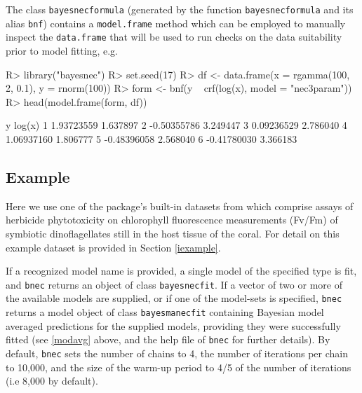 \documentclass[
  shortnames]{jss}
\begin{document}
The class \texttt{bayesnecformula} (generated by the function \texttt{bayesnecformula} and its alias \texttt{bnf}) contains a \texttt{model.frame} method which can be employed to manually inspect the \texttt{data.frame} that will be used to run checks on the data suitability prior to model fitting, e.g.

\begin{CodeChunk}
\begin{CodeInput}
R> library("bayesnec")
R> set.seed(17)
R> df <- data.frame(x = rgamma(100, 2, 0.1), y = rnorm(100))
R> form <- bnf(y ~ crf(log(x), model = "nec3param"))
R> head(model.frame(form, df))
\end{CodeInput}
\begin{CodeOutput}
            y   log(x)
1  1.93723559 1.637897
2 -0.50355786 3.249447
3  0.09236529 2.786040
4  1.06937160 1.806777
5 -0.48396058 2.568040
6 -0.41780030 3.366183
\end{CodeOutput}
\end{CodeChunk}

\newpage

\hypertarget{example}{%
\subsection{Example}\label{example}}

Here we use one of the package's built-in datasets from \citet{jones2003meps} which comprise assays of herbicide phytotoxicity on chlorophyll fluorescence measurements (Fv/Fm) of symbiotic dinoflagellates still in the host tissue of the coral. For detail on this example dataset is provided in Section \ref{iexample}.

\begin{CodeChunk}
\end{CodeChunk}

If a recognized model name is provided, a single model of the specified type is fit, and \texttt{bnec} returns an object of class \texttt{bayesnecfit}. If a vector of two or more of the available models are supplied, or if one of the model-sets is specified, \texttt{bnec} returns a model object of class \texttt{bayesmanecfit} containing Bayesian model averaged predictions for the supplied models, providing they were successfully fitted (see \ref{modavg} above, and the help file of \texttt{bnec} for further details). By default, \texttt{bnec} sets the number of chains to 4, the number of iterations per chain to 10,000, and the size of the warm-up period to 4/5 of the number of iterations (i.e 8,000 by default).
\end{document}
